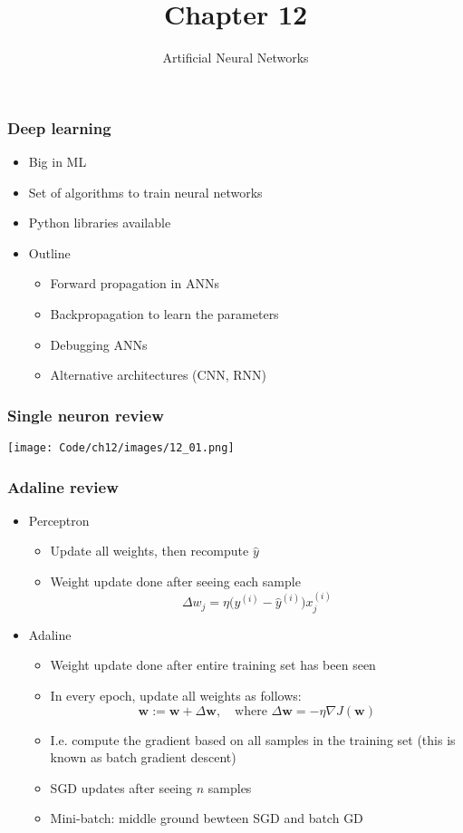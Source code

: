 \documentclass{beamer}
\title{Chapter 12}
\subtitle{Artificial Neural Networks}
\begin{document}
\maketitle

\begin{frame}
  \frametitle{Deep learning}
  \begin{itemize}
  \item Big in ML
  \item Set of algorithms to train neural networks
  \item Python libraries available
  \item Outline
    \begin{itemize}
    \item Forward propagation in ANNs
    \item Backpropagation to learn the parameters
    \item Debugging ANNs
    \item Alternative architectures (CNN, RNN)
    \end{itemize}
  \end{itemize}
\end{frame}

\begin{frame}
  \frametitle{Single neuron review}
  \texttt{[image: Code/ch12/images/12\_01.png]}  
\end{frame}

\begin{frame}
  \frametitle{Adaline review}
  \begin{itemize}
  \item Perceptron
    \begin{itemize}
    \item Update all weights, then recompute $\hat{y}$
    \item Weight update done after seeing each sample
      \[
      \Delta w_j = \eta \bigg( y^{(i)} - \hat{y}^{(i)} \bigg)x_{j}^{(i)}
      \]
    \end{itemize}
  \item Adaline
    \begin{itemize}
    \item Weight update done after entire training set has been seen
    \item In every epoch, update all weights as follows:
      \[
      \mathbf{w} := \mathbf{w} + \Delta \mathbf{w}, \quad \text{where } \Delta \mathbf{w} = - \eta \nabla J (\mathbf{w})
      \]
    \item I.e. compute the gradient based on all samples in the training set (this is known as batch gradient descent)
    \item SGD updates after seeing $n$ samples
    \item Mini-batch: middle ground bewteen SGD and batch GD
    \end{itemize}
  \end{itemize}
\end{frame}
\end{document}

